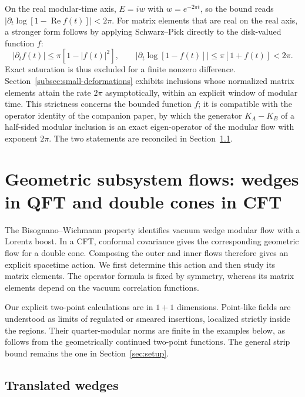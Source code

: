 \documentclass[a4paper,11pt]{article}
\theoremstyle{definition}
\begin{document}
On the real modular-time axis, $E=iw$ with $w=e^{-2\pi t}$, so the bound reads $|\partial_t\log[1-\operatorname{Re}f(t)]|<2\pi$. For matrix elements that are real on the real axis, a stronger form follows by applying Schwarz--Pick directly to the disk-valued function $f$:
\begin{equation}
 |\partial_tf(t)|\le\pi[1-|f(t)|^2],\qquad
 \left|\partial_t\log[1-f(t)]\right|\le\pi[1+f(t)]<2\pi .
 \label{eq:real-axis-modular-chaos-bound}
\end{equation}
Exact saturation is thus excluded for a finite nonzero difference. Section~\ref{subsec:small-deformations} exhibits inclusions whose normalized matrix elements attain the rate $2\pi$ asymptotically, within an explicit window of modular time. This strictness concerns the bounded function $f$; it is compatible with the operator identity of the companion paper, by which the generator $K_A-K_B$ of a half-sided modular inclusion is an exact eigen-operator of the modular flow with exponent $2\pi$. The two statements are reconciled in Section~\ref{subsec:wedge-inclusion}.

\section{Geometric subsystem flows: wedges in QFT and double cones in CFT}
\label{sec:geometric-subregion-flows}

The Bisognano--Wichmann property identifies vacuum wedge modular flow with a Lorentz boost. In a CFT, conformal covariance gives the corresponding geometric flow for a double cone. Composing the outer and inner flows therefore gives an explicit spacetime action. We first determine this action and then study its matrix elements. The operator formula is fixed by symmetry, whereas its matrix elements depend on the vacuum correlation functions.

Our explicit two-point calculations are in $1+1$ dimensions. Point-like fields are understood as limits of regulated or smeared insertions, localized strictly inside the regions. Their quarter-modular norms are finite in the examples below, as follows from the geometrically continued two-point functions. The general strip bound remains the one in Section~\ref{sec:setup}.

\subsection{Translated wedges}\label{subsec:wedge-inclusion}
\end{document}
